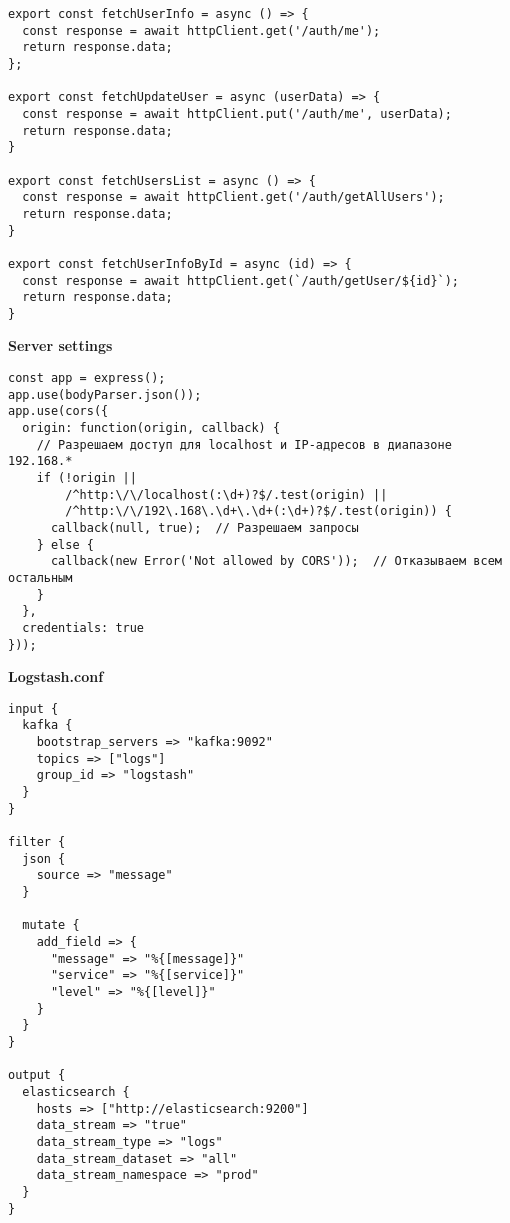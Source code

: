 \begin{lstlisting}[style=CodeListing]
export const fetchUserInfo = async () => {
  const response = await httpClient.get('/auth/me');
  return response.data;
};

export const fetchUpdateUser = async (userData) => {
  const response = await httpClient.put('/auth/me', userData);
  return response.data;
}

export const fetchUsersList = async () => {
  const response = await httpClient.get('/auth/getAllUsers');
  return response.data;
}

export const fetchUserInfoById = async (id) => {
  const response = await httpClient.get(`/auth/getUser/${id}`);
  return response.data;
}
\end{lstlisting}

\textbf{Server settings}
\begin{lstlisting}[style=CodeListing]
const app = express();
app.use(bodyParser.json());
app.use(cors({
  origin: function(origin, callback) {
    // Разрешаем доступ для localhost и IP-адресов в диапазоне 192.168.*
    if (!origin || 
        /^http:\/\/localhost(:\d+)?$/.test(origin) || 
        /^http:\/\/192\.168\.\d+\.\d+(:\d+)?$/.test(origin)) {
      callback(null, true);  // Разрешаем запросы
    } else {
      callback(new Error('Not allowed by CORS'));  // Отказываем всем остальным
    }
  },
  credentials: true
}));
\end{lstlisting}

\textbf{Logstash.conf}
\begin{lstlisting}[style=CodeListing]
  input {
  kafka {
    bootstrap_servers => "kafka:9092"
    topics => ["logs"]
    group_id => "logstash"
  }
}

filter {
  json {
    source => "message"
  }

  mutate {
    add_field => {
      "message" => "%{[message]}"
      "service" => "%{[service]}"
      "level" => "%{[level]}"
    }
  }
}

output {
  elasticsearch {
    hosts => ["http://elasticsearch:9200"]
    data_stream => "true"
    data_stream_type => "logs"
    data_stream_dataset => "all"
    data_stream_namespace => "prod"
  }
}
\end{lstlisting}

